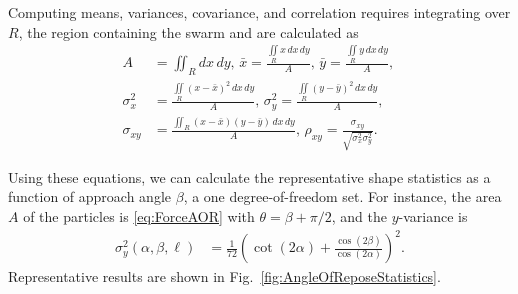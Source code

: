 Computing means, variances, covariance, and correlation requires integrating over $R$, the region containing the swarm and are calculated as%
%
\begin{align}
A &=\iint_R \!dx\,dy \text{, }
\bar{x} =\frac{\iint\limits_R x \,dx\,dy}{A} \label{eq:meanInSquareWorkspace}
\text{, } \bar{y}=\frac{\iint\limits_R y \,dx\,dy}{A} \text{, }\\
\sigma^2_x &=\frac{\iint\limits_R \left(x-\bar{x}\right)^2  \,dx \,dy}{A}  \label{eq:varInSquareWorkspace}
\text{, } \sigma^2_y =\frac{\iint\limits_R  \left(y-\bar{y}\right)^2 \,dx \,dy}{A}  \text{, }\\
\sigma_{xy} &= \frac{\iint_R  \left(x-\bar{x}\right) \left(y-\bar{y}\right) \, dx \,dy}{A} \label{eq:covAndcorrInSquareWorkspace}
\text{, }\rho_{xy} = \frac{\sigma_{xy}}{\sqrt{\sigma^2_x\sigma^2_y}}.
\end{align}

Using these equations, we can calculate the representative shape statistics as a function of approach angle $\beta$, a one degree-of-freedom set. 
For instance, the area $A$ of the particles is \eqref{eq:ForceAOR} with $\theta = \beta + \pi/2$, and the $y$-variance is
\begin{align}
\sigma_y^2(\alpha, \beta,\ell) &= \frac{1}{72}   \left( \cot(2\alpha) + \frac{\cos(2\beta)}{ \cos(2\alpha)} \right)^2.
\end{align}
Representative results are shown in Fig.~\ref{fig:AngleOfReposeStatistics}.



